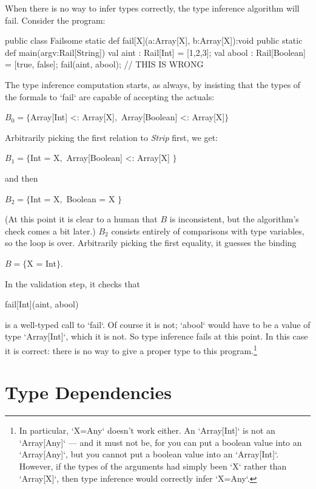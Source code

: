 \begin{ex}
When there is no way to infer types correctly, the type inference algorithm
will fail.   Consider the program: 
\begin{xten}
public class Failsome {
  static def fail[X](a:Array[X], b:Array[X]):void {}
  public static def main(argv:Rail[String]) {
    val aint  : Rail[Int]     = [1,2,3];
    val abool : Rail[Boolean] = [true, false];
    fail(aint, abool);    // THIS IS WRONG
  }
}
\end{xten}
The type inference computation starts, as always, by insisting that the types
of the formals to \xcd`fail` are capable of accepting the actuals: 
\begin{xtenmath}
$B_0=\{$Array[Int] <: Array[X]$,$ Array[Boolean] <: Array[X]$\}$
\end{xtenmath}
Arbitrarily picking the first relation to {\it Strip} first, we get:
\begin{xtenmath}
$B_1=\{$Int = X$,$ Array[Boolean] <: Array[X] $\}$
\end{xtenmath}
and then 
\begin{xtenmath}
$B_2=\{$Int = X$,$ Boolean = X $\}$
\end{xtenmath}
(At this point it is clear to a human that $B$ is inconsistent, but the
algorithm's check comes a bit later.)
{$B_2$} consists entirely of comparisons with type variables, so the loop is
over.  Arbitrarily picking the first equality, it guesses the binding 
\begin{xtenmath}
$B=\{$X = Int$\}$.
\end{xtenmath}
In the validation step, it checks that 
\begin{xtenmath}
fail[Int](aint, abool)
\end{xtenmath}
is a well-typed call to \xcd`fail`.  Of course it is not; \xcd`abool` would
have to be a value of type \xcd`Array[Int]`, which it is not.  So type
inference fails at this point.  In this case it is correct: there is no way to
give a proper type to this program.\footnote{
In particular, \xcd`X=Any` doesn't work either.  An \xcd`Array[Int]` is not an
\xcd`Array[Any]` --- and it must not be, for you can put a boolean value into
an \xcd`Array[Any]`, but you cannot put a boolean value into an
\xcd`Array[Int]`.  However, if the types of the arguments had simply been 
\xcd`X` rather than \xcd`Array[X]`, then type inference would correctly infer
\xcd`X=Any`.
}
\end{ex}

\section{Type Dependencies}

